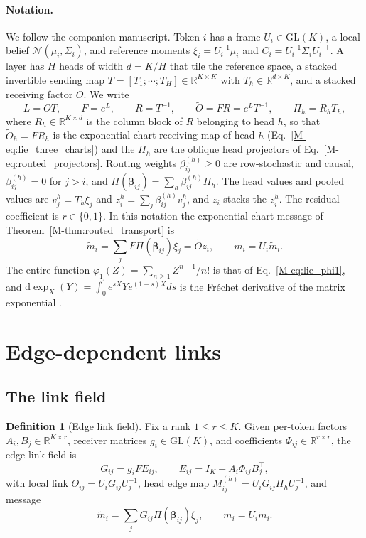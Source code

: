 \documentclass[11pt]{article}
\theoremstyle{definition}
\newtheorem{definition}[theorem]{Definition}
\theoremstyle{remark}
\providecommand{\GL}{\mathrm{GL}}
\newcommand{\R}{\mathbb R}
\newcommand{\Gauss}{\mathcal N}
\newcommand{\Ot}{\widetilde O}
\newcommand{\dexp}{\mathrm d\exp}
\newcommand{\Mref}[1]{\ref{M-#1}}
\begin{document}
\paragraph{Notation.}
We follow the companion manuscript. Token $i$ has a frame $U_i\in\GL(K)$, a local belief $\Gauss(\mu_i,\Sigma_i)$, and reference moments $\xi_i=U_i^{-1}\mu_i$ and $C_i=U_i^{-1}\Sigma_iU_i^{-\top}$. A layer has $H$ heads of width $d=K/H$ that tile the reference space, a stacked invertible sending map $T=[T_1;\cdots;T_H]\in\R^{K\times K}$ with $T_h\in\R^{d\times K}$, and a stacked receiving factor $O$. We write
\begin{equation}
L=OT,\qquad F=e^{L},\qquad R=T^{-1},\qquad \Ot=FR=e^{L}T^{-1},\qquad \Pi_h=R_hT_h,
\label{eq:notation}
\end{equation}
where $R_h\in\R^{K\times d}$ is the column block of $R$ belonging to head $h$, so that $\Ot_h=FR_h$ is the exponential-chart receiving map of head $h$ (Eq.~\Mref{eq:lie_three_charts}) and the $\Pi_h$ are the oblique head projectors of Eq.~\Mref{eq:routed_projectors}. Routing weights $\beta_{ij}^{(h)}\ge0$ are row-stochastic and causal, $\beta_{ij}^{(h)}=0$ for $j>i$, and $\Pi(\boldsymbol\beta_{ij})=\sum_h\beta_{ij}^{(h)}\Pi_h$. The head values and pooled values are $v_j^h=T_h\xi_j$ and $z_i^h=\sum_j\beta_{ij}^{(h)}v_j^h$, and $z_i$ stacks the $z_i^h$. The residual coefficient is $r\in\{0,1\}$. In this notation the exponential-chart message of Theorem~\Mref{thm:routed_transport} is
\begin{equation}
\tilde m_i=\sum_jF\Pi(\boldsymbol\beta_{ij})\xi_j=\Ot z_i,\qquad m_i=U_i\tilde m_i.
\label{eq:base_message}
\end{equation}
The entire function $\varphi_1(Z)=\sum_{n\ge1}Z^{n-1}/n!$ is that of Eq.~\Mref{eq:lie_phi1}, and $\dexp_X(Y)=\int_0^1e^{sX}Ye^{(1-s)X}ds$ is the Fr\'echet derivative of the matrix exponential \citep{Higham2008}.

\section{Edge-dependent links}
\label{sec:edge}

\subsection{The link field}

\begin{definition}[Edge link field]
\label{def:edge_link}
Fix a rank $1\le r\le K$. Given per-token factors $A_i,B_j\in\R^{K\times r}$, receiver matrices $g_i\in\GL(K)$, and coefficients $\Phi_{ij}\in\R^{r\times r}$, the edge link field is
\begin{equation}
G_{ij}=g_iFE_{ij},\qquad E_{ij}=I_K+A_i\Phi_{ij}B_j^\top,
\label{eq:edge_link}
\end{equation}
with local link $\Theta_{ij}=U_iG_{ij}U_j^{-1}$, head edge map $M^{(h)}_{ij}=U_iG_{ij}\Pi_hU_j^{-1}$, and message
\begin{equation}
\tilde m_i=\sum_jG_{ij}\Pi(\boldsymbol\beta_{ij})\xi_j,\qquad m_i=U_i\tilde m_i.
\label{eq:edge_message}
\end{equation}
\end{definition}
\end{document}
